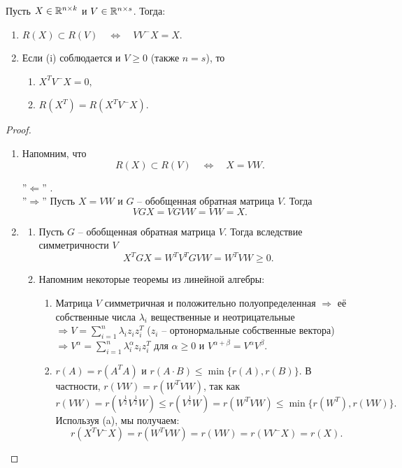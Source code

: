 \begin{lmm} \label{Range inclusion}
	Пусть $X \in \mathbb{R}^{n \times k}$ и $V \in \mathbb{R}^{n \times s}$. Тогда:
	\begin{enumerate}
		\item $R(X) \subset R(V) \quad \Longleftrightarrow \quad VV^-X = X.$
		\item Если (i) соблюдается и $V \geq 0$ (также $n = s$), то
		\begin{enumerate}
			\item $X^T V^-X = 0,$
			\item $R(X^T) = R(X^TV^-X).$
		\end{enumerate}
	\end{enumerate}
\end{lmm}
\begin{proof}
	\begin{enumerate}
		\item Напомним, что
		\[ R(X) \subset R(V) \quad \Longleftrightarrow \quad X = VW. \]
		
		''$\Longleftarrow$'' \checkmark. \\
		''$\Longrightarrow$'' Пусть $X = VW$ и $G$ -- обобщенная обратная матрица $V$. Тогда
		\[ VGX = VGVW = VW = X. \]
		\item
		\begin{enumerate}
			\item Пусть $G$ -- обобщенная обратная матрица $V$. Тогда вследствие симметричности $V$
		    \[ X^TGX = W^TV^TGVW = W^TVW \geq 0. \]
		    \item Напомним некоторые теоремы из линейной алгебры:
		    \begin{enumerate}
		    	\item Матрица $V$ симметричная и положительно полуопределенная $\Longrightarrow$ её собственные числа $\lambda_i$ вещественные и неотрицательные
		    	$\Longrightarrow V = \sum_{i=1}^n \lambda_i z_i z_i^T$ ($z_i$ -- ортонормальные собственные вектора)
		    	$\Longrightarrow V^\alpha = \sum_{i=1}^{n} \lambda_i^\alpha z_i z_i^T$ для $\alpha \geq 0$ и $V^{\alpha + \beta} = V^\alpha V^\beta$.
		    	\item $r(A) = r(A^TA)$ и $r(A \cdot B) \leq \min{\{r(A), r(B)\}}$.
		    	В частности, $r(VW) = r(W^TVW)$, так как
		    	\[ r(VW) = r(V^{\frac{1}{2}}V^{\frac{1}{2}}W) \leq r(V^{\frac{1}{2}}W) = r(W^TVW) \leq \min \{r(W^T), r(VW) \}.   \]
		    	Используя (a), мы получаем:
		    	\[ r(X^TV^-X) = r(W^TVW) = r(VW) = r(VV^-X) = r(X). \]
		    \end{enumerate}
    	\end{enumerate}  
	\end{enumerate}
\end{proof}

